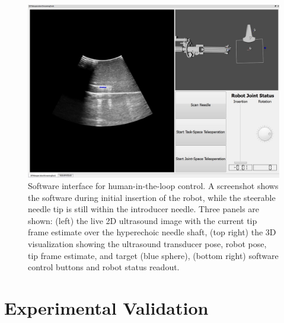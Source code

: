 \begin{figure}[!t]
\centering
\includegraphics[width = 0.9\columnwidth]{./Images/Chapter5/GUI/GUI.jpg}%
\caption[Software interface]{Software interface for human-in-the-loop control. A screenshot shows the software during initial insertion of the robot, while the steerable needle tip is still within the introducer needle. Three panels are shown: (left) the live 2D ultrasound image with the current tip frame estimate over the hyperechoic needle shaft, (top right) the 3D visualization showing the ultrasound transducer pose, robot pose, tip frame estimate, and target (blue sphere), (bottom right) software control buttons and robot status readout.}
\label{fig:GUI}
\end{figure}  






\section{Experimental Validation}
\label{sec:HumanInTheLoopValidation}

